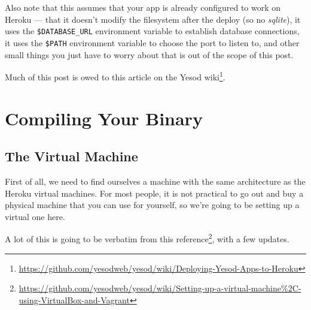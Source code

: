 \documentclass[]{article}
\renewcommand{\href}[2]{#2\footnote{\url{#1}}}
\begin{document}
Also note that this assumes that your app is already configured to work on
Heroku --- that it doesn't modify the filesystem after the deploy (so no
\emph{sqlite}), it uses the \texttt{\$DATABASE\_URL} environment variable to
establish database connections, it uses the \texttt{\$PATH} environment variable
to choose the port to listen to, and other small things you just have to worry
about that is out of the scope of this post.

Much of this post is owed to
\href{https://github.com/yesodweb/yesod/wiki/Deploying-Yesod-Apps-to-Heroku}{this
article on the Yesod wiki}.

\section{Compiling Your Binary}\label{compiling-your-binary}

\subsection{The Virtual Machine}\label{the-virtual-machine}

First of all, we need to find ourselves a machine with the same architecture as
the Heroku virtual machines. For most people, it is not practical to go out and
buy a physical machine that you can use for yourself, so we're going to be
setting up a virtual one here.

A lot of this is going to be verbatim from
\href{https://github.com/yesodweb/yesod/wiki/Setting-up-a-virtual-machine\%2C-using-VirtualBox-and-Vagrant}{this
reference}, with a few updates.
\end{document}
